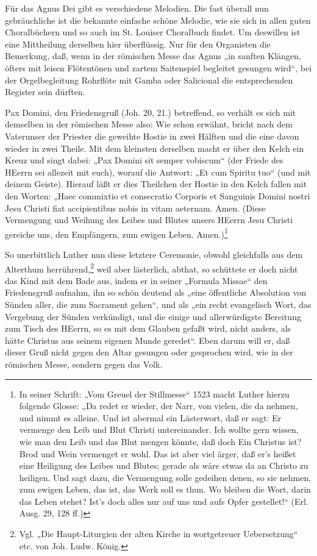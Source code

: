 Für das Agnus Dei gibt es verschiedene Melodien. Die fast überall nun gebräuchliche ist die bekannte einfache schöne Melodie, wie sie sich in allen
guten Choralbüchern und so auch im St. Louiser Choralbuch findet. Um deswillen ist eine Mittheilung derselben hier überflüssig. Nur für den Organisten die Bemerkung, daß, wenn in der römischen Messe das Agnus „in sanften Klängen, öfters mit leisen Flötentönen und zartem Saitenspiel begleitet gesungen wird“, bei der Orgelbegleitung Rohrflöte mit Gamba oder Salicional die entsprechenden Register sein dürften.

Pax Domini, den Friedensgruß (Joh. 20, 21.) betreffend, so verhält es sich mit demselben in der römischen Messe also: Wie schon erwähnt, bricht nach dem Vaterunser der Priester die geweihte Hostie in zwei Hälften und die eine davon wieder in zwei Theile. Mit dem kleinsten derselben macht er über den Kelch ein Kreuz und singt dabei: „Pax Domini sit semper vobiscum“ (der Friede des HEerrn sei allezeit mit euch), worauf die Antwort: „Et cum Spiritu tuo“ (und mit deinem Geiste). Hierauf läßt er dies Theilchen der Hostie in den Kelch fallen mit den Worten: „Haec commixtio et consecratio Corporis et Sanguinis Domini nostri Jesu Christi fiat accipientibus nobis in vitam aeternam. Amen. (Diese Vermengung und Weihung des Leibes und Blutes unsers HEerrn Jesu Christi gereiche uns, den Empfängern, zum ewigen Leben. Amen.)\footnote{In seiner Schrift: „Vom Greuel der Stillmesse“ 1523 macht Luther hierzu folgende Glosse: „Da redet er wieder, der Narr, von vielen, die da nehmen, und nimmt es alleine. Und ist abermal ein Lästerwort, daß er sagt: Er vermenge den Leib und Blut Christi untereinander. Ich wollte gern wissen, wie man den Leib und das Blut mengen könnte, daß doch Ein Christus ist? Brod und Wein vermenget er wohl. Das ist aber viel ärger, daß er’s heißet eine Heiligung des Leibes und Blutes; gerade als wäre etwas da an Christo zu heiligen. Und sagt dazu, die Vermengung solle gedeihen denen, so sie nehmen, zum ewigen Leben, das ist, das Werk soll es thun. Wo bleiben die Wort, darin das Leben stehet? Ist’s doch alles nur auf uns und aufs Opfer gestellet!“ (Erl. Ausg. 29, 128 ff.)}

So unerbittlich Luther nun diese letztere Ceremonie, obwohl gleichfalls aus dem Alterthum herrührend,\footnote{Vgl. „Die Haupt-Liturgien der alten Kirche in wortgetreuer Uebersetzung“ etc. von Joh. Ludw. König.} weil aber lästerlich, abthat, so schüttete er doch nicht das Kind mit dem Bade aus, indem er in seiner „Formula Missae“ den Friedensgruß aufnahm, ihn so schön deutend als „eine öffentliche Absolution von Sünden aller, die zum Sacrament gehen“, und als „ein recht evangelisch Wort, das Vergebung der Sünden verkündigt, und die einige und allerwürdigste Bereitung zum Tisch des HEerrn, so
es mit dem Glauben gefaßt wird, nicht anders, als hätte Christus aus seinem eigenen Munde geredet“. Eben darum will er, daß dieser Gruß nicht gegen den Altar gesungen oder gesprochen wird, wie in der römischen Messe, sondern gegen das Volk.

